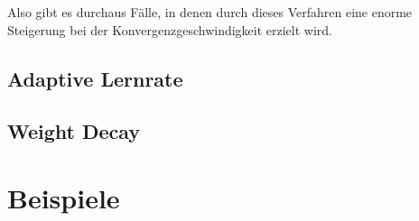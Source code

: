 \documentclass{article}
\theoremstyle{plain} %
\theoremstyle{definition} %
\begin{document}
Also gibt es durchaus Fälle, in denen durch dieses Verfahren eine enorme Steigerung bei der Konvergenzgeschwindigkeit erzielt wird.


\subsection{Adaptive Lernrate}
\subsection{Weight Decay}

\section{Beispiele}



\end{document}

